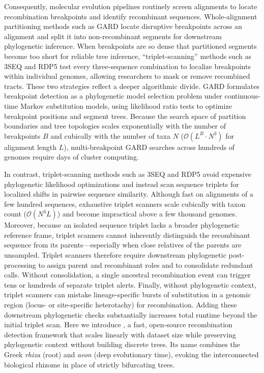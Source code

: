 Consequently, molecular evolution pipelines routinely screen alignments to locate recombination breakpoints and identify recombinant sequences. Whole-alignment partitioning methods such as GARD \citep{kosakovsky2006gard} locate disruptive breakpoints across an alignment and split it into non-recombinant segments for downstream phylogenetic inference. When breakpoints are so dense that partitioned segments become too short for reliable tree inference, ``triplet-scanning'' methods such as 3SEQ \citep{boni2007exact,lam20183seq} and RDP5 \citep{martin2021rdp5} test every three-sequence combination to localize breakpoints within individual genomes, allowing researchers to mask or remove recombined tracts. These two strategies reflect a deeper algorithmic divide. GARD formulates breakpoint detection as a phylogenetic model selection problem under continuous-time Markov substitution models, using likelihood ratio tests to optimize breakpoint positions and segment trees. Because the search space of partition boundaries and tree topologies scales exponentially with the number of breakpoints $B$ and cubically with the number of taxa $N$ ($\mathcal{O}(L^B \cdot N^3)$ for alignment length $L$), multi-breakpoint GARD searches across hundreds of genomes require days of cluster computing.

In contrast, triplet-scanning methods such as 3SEQ and RDP5 avoid expensive phylogenetic likelihood optimizations and instead scan sequence triplets for localized shifts in pairwise sequence similarity. Although fast on alignments of a few hundred sequences, exhaustive triplet scanners scale cubically with taxon count ($\mathcal{O}(N^3 L)$) and become impractical above a few thousand genomes. Moreover, because an isolated sequence triplet lacks a broader phylogenetic reference frame, triplet scanners cannot inherently distinguish the recombinant sequence from its parents—especially when close relatives of the parents are unsampled. Triplet scanners therefore require downstream phylogenetic post-processing to assign parent and recombinant roles and to consolidate redundant calls. Without consolidation, a single ancestral recombination event can trigger tens or hundreds of separate triplet alerts. Finally, without phylogenetic context, triplet scanners can mistake lineage-specific bursts of substitution in a genomic region (locus- or site-specific heterotachy) for recombination. Adding these downstream phylogenetic checks substantially increases total runtime beyond the initial triplet scan. Here we introduce \RhizAeon, a fast, open-source recombination detection framework that scales linearly with dataset size while preserving phylogenetic context without building discrete trees. Its name combines the Greek \textit{rhiza} (root) and \textit{aeon} (deep evolutionary time), evoking the interconnected biological rhizome in place of strictly bifurcating trees.
